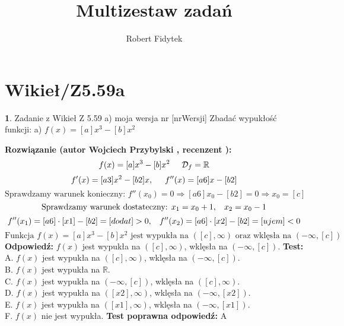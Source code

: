 \documentclass[12pt, a4paper]{article}
\title{Multizestaw zadań}
\author{Robert Fidytek}
\date{}
\theoremstyle{definition} %
\newtheorem{zad}{}
\newcommand{\kategoria}[1]{\section{#1}} %
\newcommand{\zadStart}[1]{\begin{zad}#1\newline} %
\newcommand{\zadStop}{\end{zad}}   %
\newcommand{\rozwStart}[2]{\noindent \textbf{Rozwiązanie (autor #1 , recenzent #2): }\newline} %
\newcommand{\rozwStop}{\newline}                                            %
\newcommand{\odpStart}{\noindent \textbf{Odpowiedź:}\newline}    %
\newcommand{\odpStop}{\newline}                                             %
\newcommand{\testStart}{\noindent \textbf{Test:}\newline} %
\newcommand{\testStop}{\newline} %
\newcommand{\kluczStart}{\noindent \textbf{Test poprawna odpowiedź:}\newline} %
\newcommand{\kluczStop}{\newline} %
\begin{document}
\maketitle


\kategoria{Wikieł/Z5.59a}
\zadStart{Zadanie z Wikieł Z 5.59 a) moja wersja nr [nrWersji]}
Zbadać wypukłość funkcji:
a) $ f(x)=[a]x^{3}-[b]x^{2}$
\zadStop
\rozwStart{Wojciech Przybylski}{}
$$ f(x)=[a]x^{3}-[b]x^{2}\hspace{5mm} \mathcal{D}_{f}=\mathbb{R}$$
$$ f'(x)=[a3]x^{2}-[b2]x, \hspace {5mm} f''(x)=[a6]x-[b2]$$
$$\mbox{Sprawdzamy warunek konieczny: }f''(x_{0})=0 \Rightarrow [a6]x_{0}-[b2]=0\Rightarrow x_{0}=[c]$$
$$\mbox{Sprawdzamy warunek dostateczny: }x_{1}=x_{0}+1, \hspace{3mm} x_{2}=x_{0}-1$$
$$f''(x_{1})=[a6]\cdot[x1]-[b2]=[dodat]>0,\hspace{3mm}f''(x_{2})=[a6]\cdot[x2]-[b2]=[ujem]<0$$
$$\mbox{Funkcja } f(x)=[a]x^{3}-[b]x^{2} \mbox{ jest wypukła na } ([c],\infty) \mbox{ oraz wklęsła na }(-\infty,[c])$$
\rozwStop
\odpStart
$f(x)$ jest wypukła na $([c],\infty)$, wklęsła na $(-\infty,[c])$.
\odpStop
\testStart
A. $f(x)$ jest wypukła na $([c],\infty)$, wklęsła na $(-\infty,[c])$.\\
B. $f(x)$ jest wypukła na $\mathbb{R}$.\\
C. $f(x)$ jest wypukła na $(-\infty,[c])$, wklęsła na $([c],\infty)$.\\
D. $f(x)$ jest wypukła na $([x2],\infty)$, wklęsła na $(-\infty,[x2])$.\\
E. $f(x)$ jest wypukła na $([x1],\infty)$, wklęsła na $(-\infty,[x1])$.\\
F. $f(x)$ nie jest wypukła.
\testStop
\kluczStart
A
\kluczStop
\end{document}
